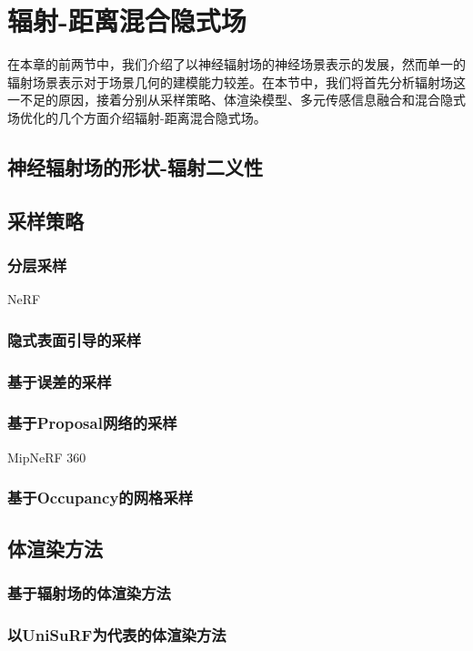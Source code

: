 \newpage
\section{辐射-距离混合隐式场}
\label{sec: related-work density-distance fields}
在本章的前两节中，我们介绍了以神经辐射场的神经场景表示的发展，然而单一的辐射场景表示对于场景几何的建模能力较差。在本节中，我们将首先分析辐射场这一不足的原因，接着分别从采样策略、体渲染模型、多元传感信息融合和混合隐式场优化的几个方面介绍辐射-距离混合隐式场。

\subsection{神经辐射场的形状-辐射二义性}

\subsection{采样策略}
\subsubsection{分层采样}
\label{sec: coarse-to-fine sampling}
NeRF
\subsubsection{隐式表面引导的采样}

\subsubsection{基于误差的采样}


\subsubsection{基于Proposal网络的采样}
MipNeRF 360

\subsubsection{基于Occupancy的网格采样}

\subsection{体渲染方法}
\subsubsection{基于辐射场的体渲染方法}

\subsubsection{以UniSuRF为代表的体渲染方法}

